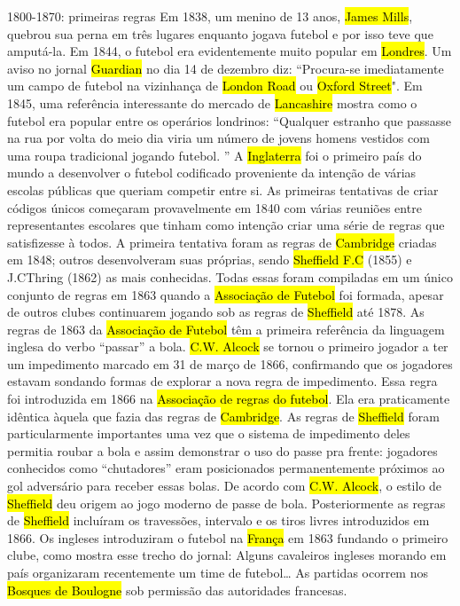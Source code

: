 \documentclass[a4paper,12pt]{article}
\begin{document}
1800-1870: primeiras regras
Em 1838, um menino de 13 anos, \hl{James Mills}, quebrou sua perna em três lugares enquanto jogava futebol e por isso teve que amputá-la.
Em 1844, o futebol era evidentemente muito popular em \hl{Londres}. Um aviso no jornal \hl{Guardian} no dia 14 de dezembro diz: “Procura-se imediatamente um campo de futebol na vizinhança de \hl{London Road} ou \hl{Oxford Street}". Em 1845, uma referência interessante do mercado de \hl{Lancashire} mostra como o futebol era popular entre os operários londrinos: “Qualquer estranho que passasse na rua por volta do meio dia viria um número de jovens homens vestidos com uma roupa tradicional jogando futebol. ”
A \hl{Inglaterra} foi o primeiro país do mundo a desenvolver o futebol codificado proveniente da intenção de várias escolas públicas que queriam competir entre si. As primeiras tentativas de criar códigos únicos começaram provavelmente em 1840 com várias reuniões entre representantes escolares que tinham como intenção criar uma série de regras que satisfizesse à todos. A primeira tentativa foram as regras de \hl{Cambridge} criadas em 1848; outros desenvolveram suas próprias, sendo \hl{Sheffield F.C} (1855) e J.CThring (1862) as mais conhecidas. Todas essas foram compiladas em um único conjunto de regras em 1863 quando a \hl{Associação de Futebol} foi formada, apesar de outros clubes continuarem jogando sob as regras de \hl{Sheffield} até 1878.
As regras de 1863 da \hl{Associação de Futebol} têm a primeira referência da linguagem inglesa do verbo “passar” a bola.
\hl{C.W. Alcock} se tornou o primeiro jogador a ter um impedimento marcado em 31 de março de 1866, confirmando que os jogadores estavam sondando formas de explorar a nova regra de impedimento. Essa regra foi introduzida em 1866 na \hl{Associação de regras do futebol}. Ela era praticamente idêntica àquela que fazia das regras de \hl{Cambridge}.
As regras de \hl{Sheffield} foram particularmente importantes uma vez que o sistema de impedimento deles permitia roubar a bola e assim demonstrar o uso do passe pra frente: jogadores conhecidos como “chutadores” eram posicionados permanentemente próximos ao gol adversário para receber essas bolas. De acordo com \hl{C.W. Alcock}, o estilo de \hl{Sheffield} deu origem ao jogo moderno de passe de bola. Posteriormente as regras de \hl{Sheffield} incluíram os travessões, intervalo e os tiros livres introduzidos em 1866.
Os ingleses introduziram o futebol na \hl{França} em 1863 fundando o primeiro clube, como mostra esse trecho do jornal: Alguns cavaleiros ingleses morando em país organizaram recentemente um time de futebol… As partidas ocorrem nos \hl{Bosques de Boulogne} sob permissão das autoridades francesas.
\end{document}
